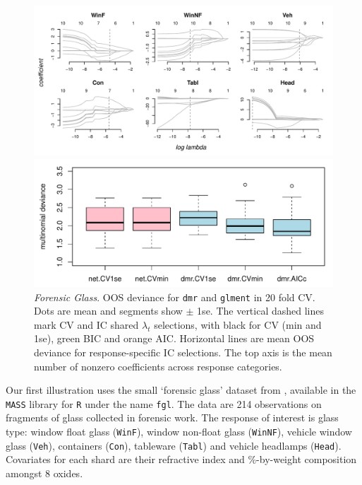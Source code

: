 \documentclass[12pt]{article}
\newcommand{\cd}[1]{{\tt#1}}
\begin{document}
\begin{figure}
\includegraphics[width=6.25in]{../graphs/fgl_coef}
\caption{\label{fgl_coef} {\it Forensic Glass}. Regularization paths for each glass-type response category.  AIC and BIC selections are marked with dashed vertical lines (orange and green respectively; they overlap for \cd{Tabl}).}
\vskip 1cm
\includegraphics[width=6.25in]{../graphs/fgl_cv}
\caption{\label{fgl_cv}  {\it Forensic Glass}. OOS deviance for \cd{dmr} and \cd{glment} in 20 fold CV.  Dots are mean and segments show $\pm$ 1se.  The vertical dashed lines mark CV and IC shared $\lambda_t$ selections, with black for CV (min and 1se), green BIC and orange AIC. Horizontal lines are mean OOS deviance for response-specific IC selections. The top axis is the mean number of nonzero coefficients across response categories.}
\end{figure}

Our first illustration uses the small `forensic glass' dataset from
\citet{venables_modern_2002}, available in the \cd{MASS} library for \cd{R}
under the name \cd{fgl}.  The data are 214 observations on fragments of glass
collected in forensic work. The response of interest is glass type: window
float glass (\cd{WinF}), window non-float glass (\cd{WinNF}), vehicle window
glass (\cd{Veh}), containers (\cd{Con}), tableware (\cd{Tabl}) and vehicle
headlamps (\cd{Head}).  Covariates for each shard are their refractive index
and \%-by-weight composition amongst 8 oxides.
\end{document}
